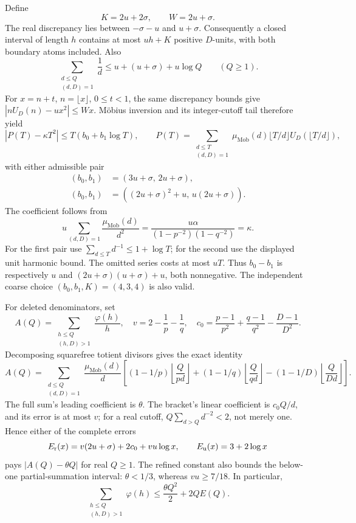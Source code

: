 \documentclass[11pt]{article}
\theoremstyle{definition}\newtheorem{definition}[theorem]{Definition}
\theoremstyle{remark}\newtheorem{remark}[theorem]{Remark}
\begin{document}
Define
\[
 K=2u+2\sigma,\qquad W=2u+\sigma .
\]
The real discrepancy lies between \(-\sigma-u\) and \(u+\sigma\).
Consequently a closed interval of length \(h\) contains at most \(uh+K\)
positive \(D\)-units, with both boundary atoms included.  Also
\[
 \sum_{\substack{d\le Q\\(d,D)=1}}\frac1d
       \le u+(u+\sigma)+u\log Q\qquad(Q\ge1).
\]
For \(x=n+t\), \(n=\lfloor x\rfloor\), \(0\le t<1\), the same discrepancy
bounds give \(\left|nU_D(n)-ux^2\right|\le Wx\).
M\"obius inversion and its integer-cutoff tail therefore yield
\begin{equation}
 \left|P(T)-\kappa T^2\right|\le T(b_0+b_1\log T),\qquad
 P(T)=\sum_{\substack{d\le T\\(d,D)=1}}\mu_{\mathrm{Mob}}(d)
       \lfloor T/d\rfloor U_D(\lfloor T/d\rfloor),
 \label{eq:finite:primitive-error}
\end{equation}
with either admissible pair
\begin{align}
 (b_0,b_1)&=(3u+\sigma,\,2u+\sigma), \label{eq:finite:pair-one}\\
 (b_0,b_1)&=((2u+\sigma)^2+u,\,u(2u+\sigma)).
 \label{eq:finite:pair-two}
\end{align}
The coefficient follows from
\[
 u\sum_{(d,D)=1}\frac{\mu_{\mathrm{Mob}}(d)}{d^2}
 =\frac{u\alpha}{(1-p^{-2})(1-q^{-2})}=\kappa .
\]
For the first pair use \(\sum_{d\le T}d^{-1}\le1+\log T\);
for the second use the displayed unit harmonic bound.  The omitted series
costs at most \(uT\).  Thus \(b_0-b_1\) is respectively \(u\) and
\((2u+\sigma)(u+\sigma)+u\), both nonnegative.
The independent coarse choice \((b_0,b_1,K)=(4,3,4)\) is also valid.

For deleted denominators, set
\[
 A(Q)=\sum_{\substack{h\le Q\\(h,D)>1}}\frac{\varphi(h)}h,\quad
 v=2-\frac1p-\frac1q,\quad
 c_0=\frac{p-1}{p^2}+\frac{q-1}{q^2}-\frac{D-1}{D^2}.
\]
Decomposing squarefree totient divisors gives the exact identity
\[
 A(Q)=\sum_{\substack{d\le Q\\(d,D)=1}}\frac{\mu_{\mathrm{Mob}}(d)}d
 \left[
 (1-1/p)\left\lfloor\frac Q{pd}\right\rfloor+
 (1-1/q)\left\lfloor\frac Q{qd}\right\rfloor-
 (1-1/D)\left\lfloor\frac Q{Dd}\right\rfloor
 \right].
\]
The full sum's leading coefficient is \(\theta\).
The bracket's linear coefficient is \(c_0Q/d\), and its error is at most \(v\);
for a real cutoff, \(Q\sum_{d>Q}d^{-2}<2\), not merely one.
Hence either of the complete errors
\begin{equation}
 E_{\rm r}(x)=v(2u+\sigma)+2c_0+vu\log x,
 \qquad E_{\rm u}(x)=3+2\log x
 \label{eq:finite:deleted-errors}
\end{equation}
pays \(|A(Q)-\theta Q|\) for real \(Q\ge1\).
The refined constant also bounds the below-one partial-summation interval:
\(\theta<1/3\), whereas \(vu\ge7/18\).
In particular,
\[
 \sum_{\substack{h\le Q\\(h,D)>1}}\varphi(h)
       \le \frac{\theta Q^2}{2}+2QE(Q).
\]
\end{document}
